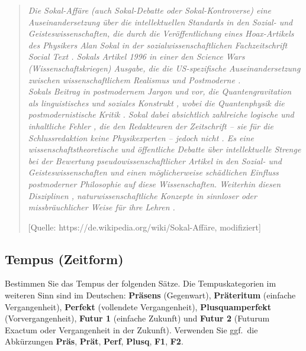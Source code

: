\documentclass[12pt,a4paper,twoside]{article}
\begin{document}
\begin{quote}
  \begin{spread}
  \it Die Sokal-Affäre (auch Sokal-Debatte oder Sokal-Kontroverse)  eine Auseinandersetzung über die intellektuellen Standards in den Sozial- und Geisteswissenschaften, die durch die Veröffentlichung eines Hoax-Artikels des Physikers Alan Sokal in der sozialwissenschaftlichen Fachzeitschrift Social Text  . Sokals Artikel  1996 in einer den Science Wars (Wissenschaftskriegen)  Ausgabe, die die US-spezifische Auseinandersetzung zwischen wissenschaftlichem Realismus und Postmoderne  .\\
  Sokals Beitrag  in postmodernem Jargon  und  vor, die Quantengravitation als linguistisches und soziales Konstrukt , wobei die Quantenphysik die postmodernistische Kritik . Sokal  dabei absichtlich zahlreiche logische und inhaltliche Fehler , die den Redakteuren der Zeitschrift – sie  für die Schlussredaktion keine Physikexperten  – jedoch nicht . Es  eine wissenschaftstheoretische und öffentliche Debatte über  intellektuelle Strenge bei der Bewertung pseudowissenschaftlicher Artikel in den Sozial- und Geisteswissenschaften und einen möglicherweise schädlichen Einfluss postmoderner Philosophie auf diese Wissenschaften. Weiterhin  diesen Disziplinen , naturwissenschaftliche Konzepte in sinnloser oder missbräuchlicher Weise für ihre Lehren .

  \footnotesize{[Quelle: https://de.wikipedia.org/wiki/Sokal-Affäre, modifiziert]}
  \end{spread}
\end{quote}


\subsection{\morphologieaufgabe Tempus (Zeitform)}

Bestimmen Sie das Tempus der folgenden Sätze.
Die Tempuskategorien im weiteren Sinn sind im Deutschen: \textbf{Präsens} (Gegenwart), \textbf{Präteritum} (einfache Vergangenheit), \textbf{Perfekt} (vollendete Vergangenheit), \textbf{Plusquamperfekt} (Vorvergangenheit), \textbf{Futur 1} (einfache Zukunft) und \textbf{Futur 2} (Futurum Exactum oder Vergangenheit in der Zukunft).
Verwenden Sie ggf.\ die Abkürzungen \textbf{Präs}, \textbf{Prät}, \textbf{Perf}, \textbf{Plusq}, \textbf{F1}, \textbf{F2}.
\end{document}
